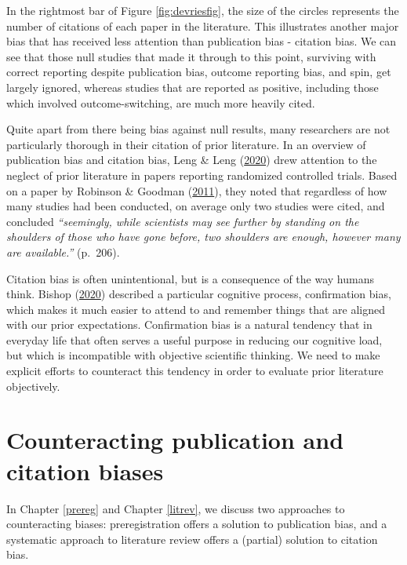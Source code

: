 \documentclass{krantz}
\begin{document}
In the rightmost bar of Figure \ref{fig:devriesfig}, the size of the circles represents the number of citations of each paper in the literature. This illustrates another major bias that has received less attention than publication bias - citation bias. We can see that those null studies that made it through to this point, surviving with correct reporting despite publication bias, outcome reporting bias, and spin, get largely ignored, whereas studies that are reported as positive, including those which involved outcome-switching, are much more heavily cited.

Quite apart from there being bias against null results, many researchers are not particularly thorough in their citation of prior literature. In an overview of publication bias and citation bias, Leng \& Leng (\protect\hyperlink{ref-leng2020}{2020}) drew attention to the neglect of prior literature in papers reporting randomized controlled trials. Based on a paper by Robinson \& Goodman (\protect\hyperlink{ref-robinson2011}{2011}), they noted that regardless of how many studies had been conducted, on average only two studies were cited, and concluded \emph{``seemingly, while scientists may see further by standing on the shoulders of those who have gone before, two shoulders are enough, however many are available.''} (p.~206).

Citation bias is often unintentional, but is a consequence of the way humans think. Bishop (\protect\hyperlink{ref-bishop2020}{2020}) described a particular cognitive process, confirmation bias, which makes it much easier to attend to and remember things that are aligned with our prior expectations. Confirmation bias is a natural tendency that in everyday life that often serves a useful purpose in reducing our cognitive load, but which is incompatible with objective scientific thinking. We need to make explicit efforts to counteract this tendency in order to evaluate prior literature objectively.

\hypertarget{counteracting-publication-and-citation-biases}{%
\section{Counteracting publication and citation biases}\label{counteracting-publication-and-citation-biases}}

In Chapter \ref{prereg} and Chapter \ref{litrev}, we discuss two approaches to counteracting biases: preregistration offers a solution to publication bias, and a systematic approach to literature review offers a (partial) solution to citation bias.
\end{document}
